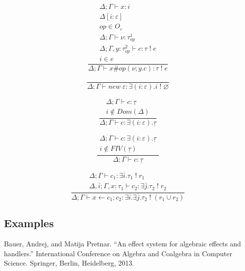 \documentclass[12pt]{article}
\newcommand\eff[0]{\varepsilon}
\newcommand\Op[0]{O}
\newcommand\op[0]{op}
\newcommand\pty[1]{\ty^1_{#1}}
\newcommand\rty[1]{\ty^2_{#1}}
\newcommand\ty[0]{\tau}
\newcommand\cty[0]{\underline{\ty}}
\newcommand\aty[2]{#1 \; ! \; #2}
\newcommand\texists[3]{\exists(#1:#2) . #3}
\newcommand\texistss[2]{\exists \overline{#1} . #2}
\newcommand\val[0]{\nu}
\newcommand\comp[0]{c}
\newcommand\cdo[3]{#1 \leftarrow #2 ; #3}
\newcommand\copi[5]{#1 \# #2(#3 ; #4 . #5)}
\newcommand\cnew[1]{\textit{new} \; #1}
\begin{document}
\begin{minipage}{0.5\textwidth}
\[\frac{
	\begin{array}{l}
	\Delta;\Gamma \vdash x : i \\
	\Delta[i : \eff] \\
	\op \in \Op_\eff\\
	\Delta;\Gamma \vdash \val : \pty{\op} \\
	\Delta;\Gamma , y : \rty{\op} \vdash \comp : \aty{\ty}{e} \\
	i \in e
	\end{array}
}{
	\Delta;\Gamma \vdash \copi{x}{\op}{\val}{y}{\comp} : \aty{\ty}{e}
}\]
\vspace{10pt}
\end{minipage}
\begin{minipage}{0.5\textwidth}
\[\frac{
}{
	\Delta;\Gamma \vdash \cnew{\eff} : \texists{i}{\eff}{\aty{i}{\varnothing}}
}\]
\vspace{10pt}
\end{minipage}
\begin{minipage}{0.5\textwidth}
\[\frac{
	\begin{array}{l}
	\Delta;\Gamma \vdash c : \cty \\
	i \notin Dom(\Delta)
	\end{array}
}{
	\Delta;\Gamma \vdash c : \texists{i}{\eff}{\cty}
}\]
\end{minipage}
\begin{minipage}{0.5\textwidth}
\[\frac{
	\begin{array}{l}
	\Delta;\Gamma \vdash c : \texists{i}{\eff}{\cty} \\
	i \notin FIV(\cty)
	\end{array}
}{
	\Delta;\Gamma \vdash c : \cty
}\]
\end{minipage}

\[\frac{
	\begin{array}{l}
	\Delta;\Gamma \vdash c_1 : \texistss{i}{\aty{\ty_1}{r_1}} \\
	\Delta,\overline{i} ; \Gamma, x : \ty_1 \vdash c_2 : \texistss{j}{\aty{\ty_2}{r_2}}
	\end{array}
}{
	\Delta;\Gamma \vdash \cdo{x}{c_1}{c_2} : \texistss{i}{\texistss{j}{\aty{\ty_2}{(r_1 \cup r_2)}}}
}\]

\subsection{Examples}

\begin{thebibliography}{9}
Bauer, Andrej, and Matija Pretnar. ``An effect system for algebraic effects and handlers.'' International Conference on Algebra and Coalgebra in Computer Science. Springer, Berlin, Heidelberg, 2013.
\end{thebibliography}
\end{document}
